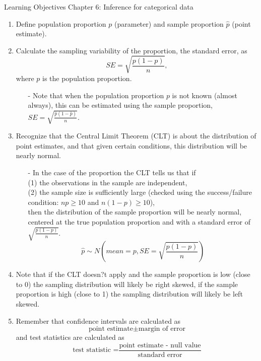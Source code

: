 \documentclass[11pt]{article}
\begin{document}
{\LARGE \textcolor{oiB}{Learning Objectives \hfill Chapter 6: Inference for categorical data}} \\

%
\begin{enumerate}
\renewcommand\labelenumi{\textcolor{light}{\textbf{LO \theenumi.}}}

\item Define population proportion $p$ (parameter) and sample proportion $\hat{p}$ (point estimate).

\item Calculate the sampling variability of the proportion, the standard error, as 
\[ SE = \sqrt{\frac{p(1-p)}{n}}, \] 
where $p$ is the population proportion.
\begin{itemize}
\item[-] Note that when the population proportion $p$ is not known (almost always), this can be estimated using the sample proportion, $SE = \sqrt{\frac{\hat{p}(1-\hat{p})}{n}}$.
\end{itemize}

\item Recognize that the Central Limit Theorem (CLT) is about the distribution of point estimates, and that given certain conditions, this distribution will be nearly normal.
\begin{itemize}
\item[-] In the case of the proportion the CLT tells us that if \\
(1) the observations in the sample are independent, \\
(2) the sample size is sufficiently large (checked using the success/failure condition: $np \ge 10$ and $n(1-p) \ge 10$), \\
then the distribution of the sample proportion will be nearly normal, centered at the true population proportion and with a standard error of $\sqrt{\frac{p(1-p)}{n}}$.
\[ \hat{p} \sim N \left( mean = p, SE = \sqrt{\frac{p(1-p)}{n}} \right) \]
\end{itemize}

\item Note that if the CLT doesn?t apply and the sample proportion is low (close to 0) the sampling distribution will likely be right skewed, if the sample proportion is high (close to 1) the sampling distribution will likely be left skewed. 

\item Remember that confidence intervals are calculated as 
\[ \text{point estimate} \pm \text{margin of error} \]
and test statistics are calculated as 
\[ \text{test statistic =} \frac{\text{point estimate - null value}}{\text{standard error}} \]


\end{enumerate}
\end{document}
